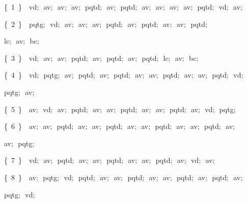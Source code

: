 {\vspace{\neglskip}\mbox{\blc  \blk\blk\idt  \cmt  \{\ 1\ \}\idt \ \ vd$;$\ av$;$\ av$;$\ av$;$\ pqtd$;$\ av$;$\ pqtd$;$\ av$;$\ av$;$\ av$;$\ av$;$\ pqtd$;$\ vd$;$\ av$;$}\par 
\vspace{\neglskip}\mbox{\blc  \blk\blk\idt  \cmt  \{\ 2\ \}\idt \ \ pqtg$;$\ vd$;$\ av$;$\ av$;$\ av$;$\ pqtd$;$\ av$;$\ pqtd$;$\ av$;$\ av$;$\ pqtd$;$}\par 
\vspace{\neglskip}\mbox{\blc  \blk\blk\blk\blk\blk\blk\blk\blk\blk\idt  lc$;$\ av$;$\ bc$;$}\par 
\vspace{\neglskip}\mbox{\blc  \blk\blk\idt  \cmt  \{\ 3\ \}\idt \ \ vd$;$\ av$;$\ av$;$\ pqtd$;$\ av$;$\ pqtd$;$\ av$;$\ pqtd$;$\ lc$;$\ av$;$\ bc$;$}\par 
\vspace{\neglskip}\mbox{\blc  \blk\blk\idt  \cmt  \{\ 4\ \}\idt \ \ vd$;$\ pqtg$;$\ av$;$\ pqtd$;$\ av$;$\ pqtd$;$\ av$;$\ av$;$\ pqtd$;$\ av$;$\ av$;$\ pqtd$;$\ vd$;$}\par 
\vspace{\neglskip}\mbox{\blc  \blk\blk\blk\blk\blk\blk\blk\blk\blk\idt  pqtg$;$\ av$;$\ }\par 
\vspace{\neglskip}\mbox{\blc  \blk\blk\idt  \cmt  \{\ 5\ \}\idt \ \ av$;$\ vd$;$\ av$;$\ pqtd$;$\ av$;$\ av$;$\ pqtd$;$\ av$;$\ av$;$\ pqtd$;$\ av$;$\ vd$;$\ pqtg$;$}\par 
\vspace{\neglskip}\mbox{\blc  \blk\blk\idt  \cmt  \{\ 6\ \}\idt \ \ av$;$\ av$;$\ pqtd$;$\ av$;$\ av$;$\ pqtd$;$\ av$;$\ av$;$\ pqtd$;$\ av$;$\ av$;$\ pqtd$;$\ av$;$}\par 
\vspace{\neglskip}\mbox{\blc  \blk\blk\blk\blk\blk\blk\blk\blk\blk\idt  av$;$\ pqtg$;$\ }\par 
\vspace{\neglskip}\mbox{\blc  \blk\blk\idt  \cmt  \{\ 7\ \}\idt \ \ vd$;$\ av$;$\ pqtd$;$\ av$;$\ av$;$\ pqtd$;$\ av$;$\ av$;$\ pqtd$;$\ av$;$\ vd$;$\ av$;$}\par 
\vspace{\neglskip}\mbox{\blc  \blk\blk\idt  \cmt  \{\ 8\ \}\idt \ \ av$;$\ pqtg$;$\ vd$;$\ pqtd$;$\ av$;$\ av$;$\ pqtd$;$\ av$;$\ av$;$\ pqtd$;$\ av$;$\ pqtd$;$\ av$;$\ }\par 
\vspace{\neglskip}\mbox{\blc  \blk\blk\blk\blk\blk\blk\blk\blk\blk\idt  pqtg$;$\ vd$;$}\par 
}
